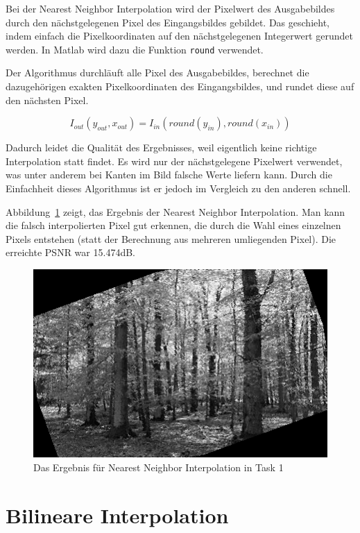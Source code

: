 Bei der Nearest Neighbor Interpolation wird der Pixelwert des Ausgabebildes durch den nächstgelegenen Pixel des Eingangsbildes gebildet. Das geschieht, indem einfach die Pixelkoordinaten auf den nächstgelegenen Integerwert gerundet werden. In Matlab wird dazu die Funktion \texttt{round} verwendet.

Der Algorithmus durchläuft alle Pixel des Ausgabebildes, berechnet die dazugehörigen exakten Pixelkoordinaten des Eingangsbildes, und rundet diese auf den nächsten Pixel.

\begin{equation}
 I_{out}(y_{out}, x_{out}) = I_{in}(round(y_{in}), round(x_{in}))
\end{equation}

Dadurch leidet die Qualität des Ergebnisses, weil eigentlich keine richtige Interpolation statt findet. Es wird nur der nächstgelegene Pixelwert verwendet, was unter anderem bei Kanten im Bild falsche Werte liefern kann. Durch die Einfachheit dieses Algorithmus ist er jedoch im Vergleich zu den anderen schnell.


\smallskip

Abbildung~\ref{fig:t1_nn} zeigt, das Ergebnis der Nearest Neighbor Interpolation. Man kann die falsch interpolierten Pixel gut erkennen, die durch die Wahl eines einzelnen Pixels entstehen (statt der Berechnung aus mehreren umliegenden Pixel). Die erreichte PSNR war 15.474dB.

\begin{figure}[htb]
 \centering
 \includegraphics{./img/t1_nn.png}
 \caption{Das Ergebnis für Nearest Neighbor Interpolation in Task 1}
 \label{fig:t1_nn}
\end{figure}

\clearpage



\section{Bilineare Interpolation}
\label{t1_bl}

